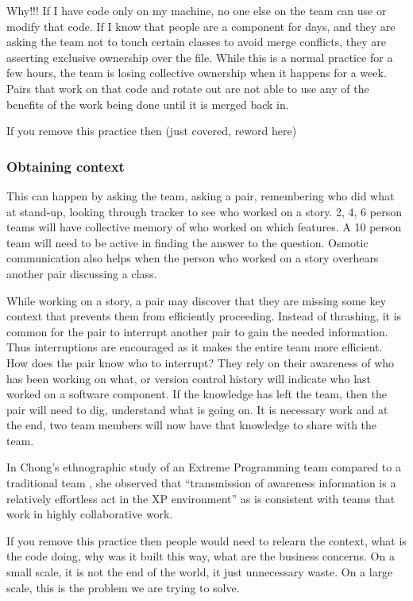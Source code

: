Why!!! If I have code only on my machine, no one else on the team can use or modify that code. If I know that people are  a component for days, and they are asking the team not to touch certain classes to avoid merge conflicts, they are asserting exclusive ownership over the file. While this is a normal practice for a few hours, the team is losing collective ownership when it happens for a week. Pairs that work on that code and rotate out are not able to use any of the benefits of the work being done until it is merged back in. 

If you remove this practice then (just covered, reword here)

\subsubsection{Obtaining context}
This can happen by asking the team, asking a pair, remembering who did what at stand-up, looking through tracker to see who worked on a story. 2, 4, 6 person teams will have collective memory of who worked on which features. A 10 person team will need to be active in finding the answer to the question. Osmotic communication also helps when the person who worked on a story overhears another pair discussing a class.

While working on a story, a pair may discover that they are missing some key context that prevents them from efficiently proceeding. Instead of thrashing, it is common for the pair to interrupt another pair to gain the needed information. Thus interruptions are encouraged as it makes the entire team more efficient. How does the pair know who to interrupt? They rely on their awareness of who has been working on what, or version control history will indicate who last worked on a software component. If the knowledge has left the team, then the pair will need to dig, understand what is going on. It is necessary work and at the end, two team members will now have that knowledge to share with the team. 

In Chong's ethnographic study of an Extreme Programming team compared to a traditional team \cite{ChongNominum}, she observed that ``transmission of awareness information is a relatively effortless act in the XP environment” as is consistent with teams that work in highly collaborative work. 

If you remove this practice then people would need to relearn the context, what is the code doing, why was it built this way, what are the business concerns. On a small scale, it is not the end of the world, it just unnecessary waste. On a large scale, this is the problem we are trying to solve.


